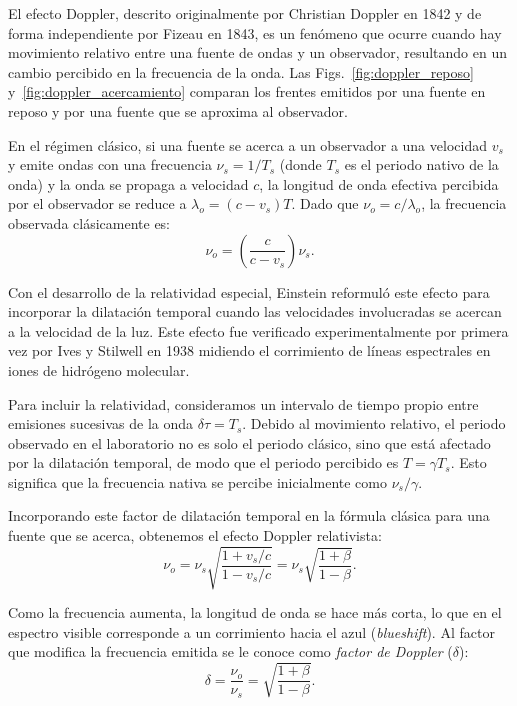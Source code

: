 El efecto Doppler, descrito originalmente por Christian Doppler en 1842 y de forma independiente por Fizeau en 1843, es un fenómeno que ocurre cuando hay movimiento relativo entre una fuente de ondas y un observador, resultando en un cambio percibido en la frecuencia de la onda. Las Figs.~\ref{fig:doppler_reposo} y~\ref{fig:doppler_acercamiento} comparan los frentes emitidos por una fuente en reposo y por una fuente que se aproxima al observador.





En el régimen clásico, si una fuente se acerca a un observador a una velocidad $v_s$ y emite ondas con una frecuencia $\nu_s = 1/T_s$ (donde $T_s$ es el periodo nativo de la onda) y la onda se propaga a velocidad $c$, la longitud de onda efectiva percibida por el observador se reduce a $\lambda_o = (c - v_s)T$. Dado que $\nu_o = c/\lambda_o$, la frecuencia observada clásicamente es:
$$
\nu_o = \left(\frac{c}{c - v_s}\right)\nu_s.
$$

Con el desarrollo de la relatividad especial, Einstein reformuló este efecto para incorporar la dilatación temporal cuando las velocidades involucradas se acercan a la velocidad de la luz. Este efecto fue verificado experimentalmente por primera vez por Ives y Stilwell en 1938 midiendo el corrimiento de líneas espectrales en iones de hidrógeno molecular.

Para incluir la relatividad, consideramos un intervalo de tiempo propio entre emisiones sucesivas de la onda $\delta\tau = T_s$. Debido al movimiento relativo, el periodo observado en el laboratorio no es solo el periodo clásico, sino que está afectado por la dilatación temporal, de modo que el periodo percibido es $T = \gamma T_s$. Esto significa que la frecuencia nativa se percibe inicialmente como $\nu_s/\gamma$. 

Incorporando este factor de dilatación temporal en la fórmula clásica para una fuente que se acerca, obtenemos el efecto Doppler relativista:
$$
\nu_o = \nu_s \sqrt{\frac{1 + v_s/c}{1 - v_s/c}} = \nu_s \sqrt{\frac{1 + \beta}{1 - \beta}}.
$$

Como la frecuencia aumenta, la longitud de onda se hace más corta, lo que en el espectro visible corresponde a un corrimiento hacia el azul (\emph{blueshift}). Al factor que modifica la frecuencia emitida se le conoce como \emph{factor de Doppler} ($\delta$):
$$
\delta = \frac{\nu_o}{\nu_s} = \sqrt{\frac{1 + \beta}{1 - \beta}}.
$$

